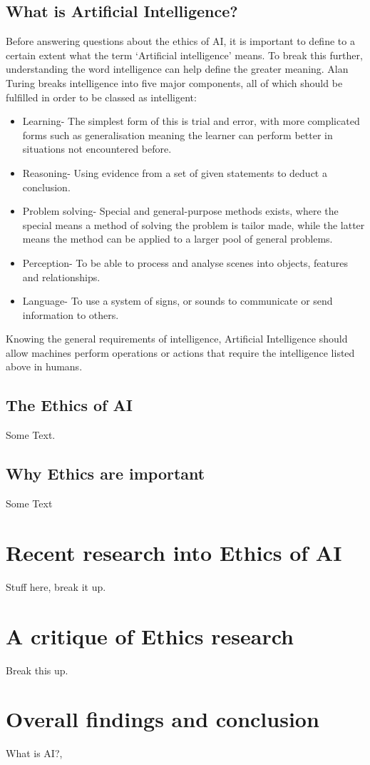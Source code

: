 \documentclass[article]{IEEEtran}
\begin{document}
\subsection{What is Artificial Intelligence?}
Before answering questions about the ethics of AI, it is important to define to a certain extent what the term ‘Artificial intelligence’ means. To break this further, understanding the word intelligence can help define the greater meaning. Alan Turing \cite{Alan Turing website} breaks intelligence into five major components, all of which should be fulfilled in order to be classed as intelligent:
\begin{itemize}
\item Learning- The simplest form of this is trial and error, with more complicated forms such as generalisation meaning the learner can perform better in situations not encountered before.
\item Reasoning- Using evidence from a set of given statements to deduct a conclusion.
\item Problem solving- Special and general-purpose methods exists, where the special means a method of solving the problem is tailor made, while the latter means the method can be applied to a larger pool of general problems.	
\item Perception- To be able to process and analyse scenes into objects, features and relationships.
\item Language- To use a system of signs, or sounds to communicate or send information to others. 
\end{itemize}
Knowing the general requirements of intelligence, Artificial Intelligence should allow machines perform operations or actions that require the intelligence listed above in humans.


\subsection{The Ethics of AI}
Some Text.

\subsection{Why Ethics are important}
Some Text

\section{Recent research into Ethics of AI}
Stuff here, break it up.

\section{A critique of Ethics research}
Break this up.

\section{Overall findings and conclusion}

\begin{thebibliography}{9}

What is AI?,
\\
\end{thebibliography}
\end{document}
